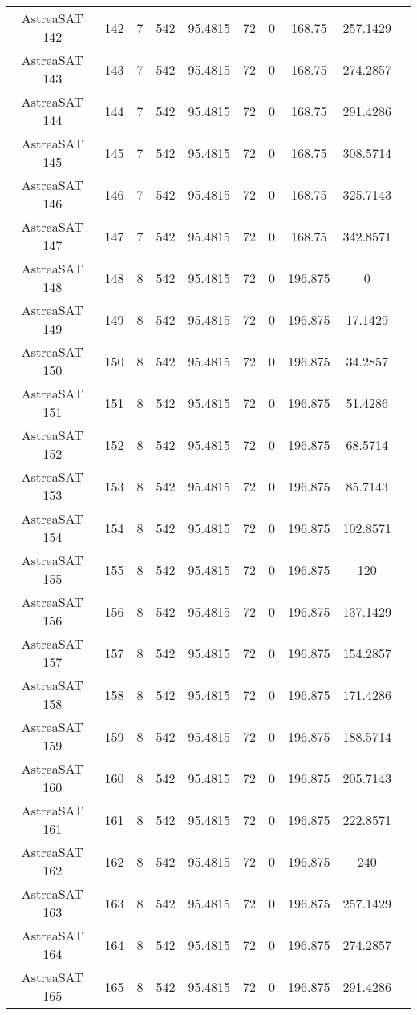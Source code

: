 \begin{longtable}{| c | c | c | c | c | c | c | c | c | c |}
AstreaSAT 142 & 142 & 7 & 542 & 95.4815 & 72 & 0 & 168.75 & 257.1429 \\ 
AstreaSAT 143 & 143 & 7 & 542 & 95.4815 & 72 & 0 & 168.75 & 274.2857 \\ 
AstreaSAT 144 & 144 & 7 & 542 & 95.4815 & 72 & 0 & 168.75 & 291.4286 \\ 
AstreaSAT 145 & 145 & 7 & 542 & 95.4815 & 72 & 0 & 168.75 & 308.5714 \\ 
AstreaSAT 146 & 146 & 7 & 542 & 95.4815 & 72 & 0 & 168.75 & 325.7143 \\ 
AstreaSAT 147 & 147 & 7 & 542 & 95.4815 & 72 & 0 & 168.75 & 342.8571 \\ 
AstreaSAT 148 & 148 & 8 & 542 & 95.4815 & 72 & 0 & 196.875 & 0 \\ 
AstreaSAT 149 & 149 & 8 & 542 & 95.4815 & 72 & 0 & 196.875 & 17.1429 \\ 
AstreaSAT 150 & 150 & 8 & 542 & 95.4815 & 72 & 0 & 196.875 & 34.2857 \\ 
AstreaSAT 151 & 151 & 8 & 542 & 95.4815 & 72 & 0 & 196.875 & 51.4286 \\ 
AstreaSAT 152 & 152 & 8 & 542 & 95.4815 & 72 & 0 & 196.875 & 68.5714 \\ 
AstreaSAT 153 & 153 & 8 & 542 & 95.4815 & 72 & 0 & 196.875 & 85.7143 \\ 
AstreaSAT 154 & 154 & 8 & 542 & 95.4815 & 72 & 0 & 196.875 & 102.8571 \\ 
AstreaSAT 155 & 155 & 8 & 542 & 95.4815 & 72 & 0 & 196.875 & 120 \\ 
AstreaSAT 156 & 156 & 8 & 542 & 95.4815 & 72 & 0 & 196.875 & 137.1429 \\ 
AstreaSAT 157 & 157 & 8 & 542 & 95.4815 & 72 & 0 & 196.875 & 154.2857 \\ 
AstreaSAT 158 & 158 & 8 & 542 & 95.4815 & 72 & 0 & 196.875 & 171.4286 \\ 
AstreaSAT 159 & 159 & 8 & 542 & 95.4815 & 72 & 0 & 196.875 & 188.5714 \\ 
AstreaSAT 160 & 160 & 8 & 542 & 95.4815 & 72 & 0 & 196.875 & 205.7143 \\ 
AstreaSAT 161 & 161 & 8 & 542 & 95.4815 & 72 & 0 & 196.875 & 222.8571 \\ 
AstreaSAT 162 & 162 & 8 & 542 & 95.4815 & 72 & 0 & 196.875 & 240 \\ 
AstreaSAT 163 & 163 & 8 & 542 & 95.4815 & 72 & 0 & 196.875 & 257.1429 \\ 
AstreaSAT 164 & 164 & 8 & 542 & 95.4815 & 72 & 0 & 196.875 & 274.2857 \\ 
AstreaSAT 165 & 165 & 8 & 542 & 95.4815 & 72 & 0 & 196.875 & 291.4286 \\ 

\end{longtable}
